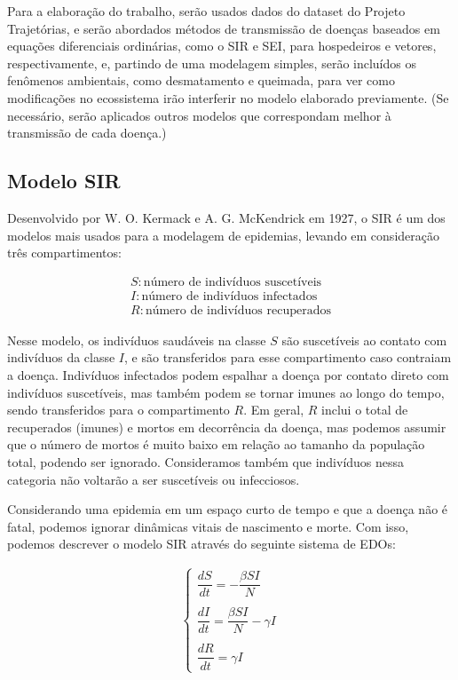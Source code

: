 \documentclass[12pt]{article}
\begin{document}
Para a elaboração do trabalho, serão usados dados do dataset do Projeto Trajetórias, e serão abordados métodos de transmissão de doenças baseados em equações diferenciais ordinárias, como o SIR e SEI, para hospedeiros e vetores, respectivamente, e, partindo de uma modelagem simples, serão incluídos os fenômenos ambientais, como desmatamento e queimada, para ver como modificações no ecossistema irão interferir no modelo elaborado previamente. (Se necessário, serão aplicados outros modelos que correspondam melhor à transmissão de cada doença.) 

\subsection{Modelo SIR}

Desenvolvido por W. O. Kermack e A. G. McKendrick em 1927, o SIR é um dos modelos mais usados para a modelagem de epidemias, levando em consideração três compartimentos:

\begin{gather*}
    S: \text{número de indivíduos suscetíveis} \\
    I: \text{número de indivíduos infectados} \\
    R: \text{número de indivíduos recuperados}
\end{gather*}

Nesse modelo, os indivíduos saudáveis na classe $S$ são suscetíveis ao contato com indivíduos da classe $I$, e são transferidos para esse compartimento caso contraiam a doença. Indivíduos infectados podem espalhar a doença por contato direto com indivíduos suscetíveis, mas também podem se tornar imunes ao longo do tempo, sendo transferidos para o compartimento $R$. Em geral, $R$ inclui o total de recuperados (imunes) e mortos em decorrência da doença, mas podemos assumir que o número de mortos é muito baixo em relação ao tamanho da população total, podendo ser ignorado. Consideramos também que indivíduos nessa categoria não voltarão a ser suscetíveis ou infecciosos.   

Considerando uma epidemia em um espaço curto de tempo e que a doença não é fatal, podemos ignorar dinâmicas vitais de nascimento e morte. Com isso, podemos descrever o modelo SIR através do seguinte sistema de EDOs:

\begin{gather*}
\begin{cases}
\dfrac{dS}{dt} = -\dfrac{\beta SI}{N} \\
\\
\dfrac{dI}{dt} = \dfrac{\beta SI}{N} - \gamma I \\
\\
\dfrac{dR}{dt} = \gamma I
\end{cases}
\end{gather*}
\end{document}
